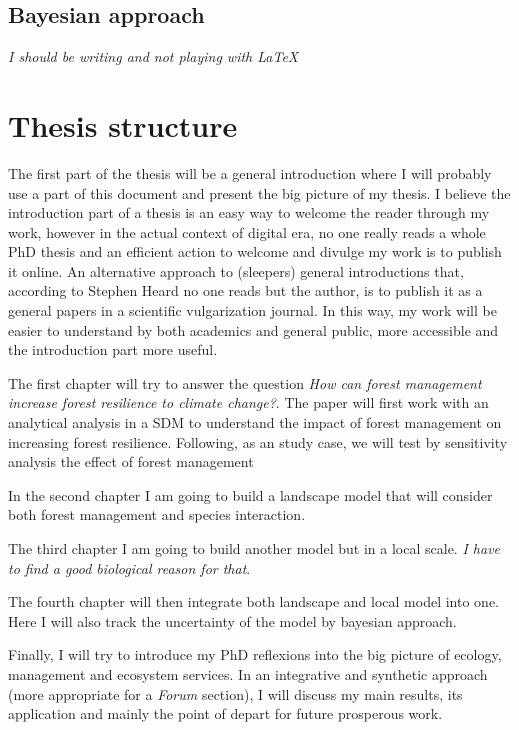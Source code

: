 \subsection{Bayesian approach}

\textit{I should be writing and not playing with \LaTeX}

\section{Thesis structure}

The first part of the thesis will be a general introduction where I will probably use a part of this document and present the big picture of my thesis.
I believe the introduction part of a thesis is an easy way to welcome the reader through my work, however in the actual context of digital era, no one really reads a whole PhD thesis and an efficient action to welcome and divulge my work is to publish it online.
An alternative approach to (sleepers) general introductions that, according to Stephen Heard\footnotemark{} no one reads but the author, is to publish it as a general papers in a scientific vulgarization journal.
In this way, my work will be easier to understand by both academics and general public, more accessible and the introduction part more useful.

The first chapter will try to answer the question \textit{How can forest management increase forest resilience to climate change?}.
The paper will first work with an analytical analysis in a SDM to understand the impact of forest management on increasing forest resilience.
Following, as an study case, we will test by sensitivity analysis the effect of forest management

In the second chapter I am going to build a landscape model that will consider both forest management and species interaction.

The third chapter I am going to build another model but in a local scale. \textit{I have to find a good biological reason for that}.

The fourth chapter will then integrate both landscape and local model into one. Here I will also track the uncertainty of the model by bayesian approach.

Finally, I will try to introduce my PhD reflexions into the big picture of ecology, management and ecosystem services. In an integrative and synthetic approach (more appropriate for a \textit{Forum} section), I will discuss my main results, its application and mainly the point of depart for future prosperous work.


\clearpage



